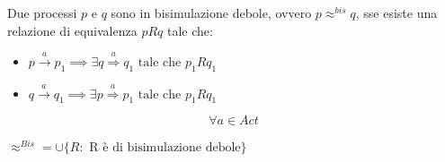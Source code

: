 \begin{definizione}
   Due processi $p$ e $q$ sono in bisimulazione debole, ovvero $p\approx^{bis} q$, sse esiste una relazione di equivalenza $pRq$ tale che: 
  \begin{itemize}
      \item $p\stackrel{a}{\rightarrow}p_1 \implies \exists
    q\stackrel{a}{\Rightarrow}q_1 \mbox{ tale che } p_1Rq_1$
    \item   $q\stackrel{a}{\rightarrow}q_1 \implies \exists
    p\stackrel{a}{\Rightarrow}p_1 \mbox{ tale che } p_1Rq_1$
  \end{itemize}
  

    
    \[\forall a\in  Act\]

 \begin{corollario}
  $\approx^{Bis}=\cup\{R:\mbox{ R è di bisimulazione debole}\}$
 \end{corollario}
\end{definizione} \vspace{5mm} %
